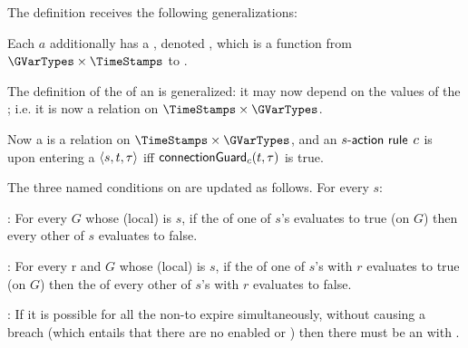 \documentclass[12pt]{article}
\begin{document}

 The \Event definition receives the following generalizations:
\begin{LPPI}
\item Each \Action $a$ additionally has a \gvTransform, denoted , which is a function from
$\GVarTypes \times \TimeStamps$ to \GVarTypes.
\item The definition of the \TGuard of an  is generalized: it may now depend on the values of the \GVars; i.e. it is now a relation on $\TimeStamps \times \GVarTypes$.
\end{LPPI}

Now a \TGuard is a relation on $\TimeStamps \times \GVarTypes$, and an $s\textsf{-{action rule}}$ $c$ is  upon entering a \GlobalState $\langle s,t,\tau\rangle$ iff $\textsf{connectionGuard}_{c}(t,\tau)$ is true.


The three named conditions on \TGuards are updated as follows. For every \State $s$:
\medskip

\noindent {}: For every \GlobalState $G$ whose (local) \State is $s$, if the \TGuard of one of $s$'s \mustnarules evaluates to true (on $G$) then every other \TGuard of $s$ evaluates to false. 
\medskip

\noindent {}: For every \Role r and \GlobalState $G$ whose (local) \State is $s$, if the \TGuard of one of $s$'s \rmustnarules with \Role $r$ evaluates to true (on $G$) then the \TGuard of every other of $s$'s \rmustnarules with \Role $r$ evaluates to false.
\medskip

\noindent {}: If it is possible for all the \enabled non-\Env \actionrules to expire simultaneously, without causing a breach (which entails that there are no enabled \mustnarules or \rmustnarules) then there must be an \depTrans{\Env} with \Deadline \nodeadline.


\end{document}
